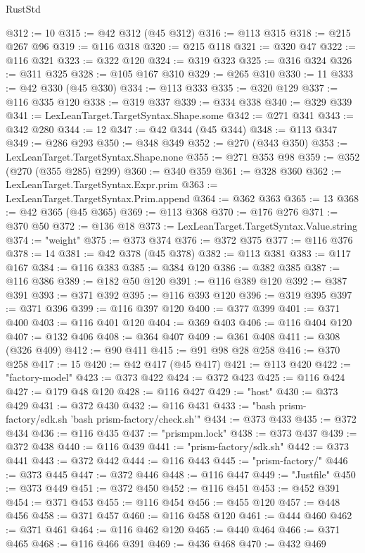 \begin{lexlean}{RustStd}
\begin{coremodule}
@312 := 10
@315 := @42 @312 (@45 @312)
@316 := @113 @315
@318 := @215 @267 @96
@319 := @116 @318
@320 := @215 @118
@321 := @320 @47
@322 := @116 @321
@323 := @322 @120
@324 := @319 @323
@325 := @316 @324
@326 := @311 @325
@328 := @105 @167 @310
@329 := @265 @310
@330 := 11
@333 := @42 @330 (@45 @330)
@334 := @113 @333
@335 := @320 @129
@337 := @116 @335 @120
@338 := @319 @337
@339 := @334 @338
@340 := @329 @339
@341 := LexLeanTarget.TargetSyntax.Shape.some
@342 := @271 @341
@343 := @342 @280
@344 := 12
@347 := @42 @344 (@45 @344)
@348 := @113 @347
@349 := @286 @293
@350 := @348 @349
@352 := @270 (@343 @350)
@353 := LexLeanTarget.TargetSyntax.Shape.none
@355 := @271 @353 @98
@359 := @352 (@270 (@355 @285) @299)
@360 := @340 @359
@361 := @328 @360
@362 := LexLeanTarget.TargetSyntax.Expr.prim
@363 := LexLeanTarget.TargetSyntax.Prim.append
@364 := @362 @363
@365 := 13
@368 := @42 @365 (@45 @365)
@369 := @113 @368
@370 := @176 @276
@371 := @370 @50
@372 := @136 @18
@373 := LexLeanTarget.TargetSyntax.Value.string
@374 := "weight"
@375 := @373 @374
@376 := @372 @375
@377 := @116 @376
@378 := 14
@381 := @42 @378 (@45 @378)
@382 := @113 @381
@383 := @117 @167
@384 := @116 @383
@385 := @384 @120
@386 := @382 @385
@387 := @116 @386
@389 := @182 @50 @120
@391 := @116 @389 @120
@392 := @387 @391
@393 := @371 @392
@395 := @116 @393 @120
@396 := @319 @395
@397 := @371 @396
@399 := @116 @397 @120
@400 := @377 @399
@401 := @371 @400
@403 := @116 @401 @120
@404 := @369 @403
@406 := @116 @404 @120
@407 := @132 @406
@408 := @364 @407
@409 := @361 @408
@411 := @308 (@326 @409)
@412 := @90 @411
@415 := @91 @98 @28 @258
@416 := @370 @258
@417 := 15
@420 := @42 @417 (@45 @417)
@421 := @113 @420
@422 := "factory-model"
@423 := @373 @422
@424 := @372 @423
@425 := @116 @424
@427 := @179 @48 @120
@428 := @116 @427
@429 := "host"
@430 := @373 @429
@431 := @372 @430
@432 := @116 @431
@433 := "bash prism-factory/sdk.sh 'bash prism-factory/check.sh'"
@434 := @373 @433
@435 := @372 @434
@436 := @116 @435
@437 := "prismpm.lock"
@438 := @373 @437
@439 := @372 @438
@440 := @116 @439
@441 := "prism-factory/sdk.sh"
@442 := @373 @441
@443 := @372 @442
@444 := @116 @443
@445 := "prism-factory/"
@446 := @373 @445
@447 := @372 @446
@448 := @116 @447
@449 := "Justfile"
@450 := @373 @449
@451 := @372 @450
@452 := @116 @451
@453 := @452 @391
@454 := @371 @453
@455 := @116 @454
@456 := @455 @120
@457 := @448 @456
@458 := @371 @457
@460 := @116 @458 @120
@461 := @444 @460
@462 := @371 @461
@464 := @116 @462 @120
@465 := @440 @464
@466 := @371 @465
@468 := @116 @466 @391
@469 := @436 @468
@470 := @432 @469

\end{coremodule}
\end{lexlean}
